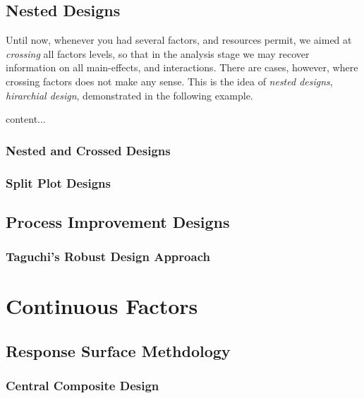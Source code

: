 \subsection{Nested Designs}
Until now, whenever you had several factors, and resources permit, we aimed at \emph{crossing} all factors levels, so that in the analysis stage we may recover information on all main-effects, and interactions.
There are cases, however, where crossing factors does not make any sense.
This is the idea of \emph{nested designs}, \aka \emph{hirarchial design}, demonstrated in the following example.

\begin{example}[TODO]
content...
\end{example}


\subsubsection{Nested and Crossed Designs}

\subsubsection{Split Plot Designs}




\subsection{Process Improvement Designs}



\subsubsection{Taguchi's Robust Design Approach}



\section{Continuous Factors}



\subsection{Response Surface Methdology}
\label{sec:response_surface}

\subsubsection{Central Composite Design}

